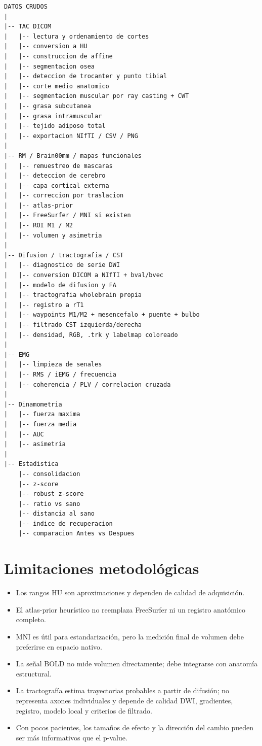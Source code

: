 \documentclass[12pt,a4paper]{article}
\begin{document}
\begin{lstlisting}
DATOS CRUDOS
|
|-- TAC DICOM
|   |-- lectura y ordenamiento de cortes
|   |-- conversion a HU
|   |-- construccion de affine
|   |-- segmentacion osea
|   |-- deteccion de trocanter y punto tibial
|   |-- corte medio anatomico
|   |-- segmentacion muscular por ray casting + CWT
|   |-- grasa subcutanea
|   |-- grasa intramuscular
|   |-- tejido adiposo total
|   |-- exportacion NIfTI / CSV / PNG
|
|-- RM / Brain00mm / mapas funcionales
|   |-- remuestreo de mascaras
|   |-- deteccion de cerebro
|   |-- capa cortical externa
|   |-- correccion por traslacion
|   |-- atlas-prior
|   |-- FreeSurfer / MNI si existen
|   |-- ROI M1 / M2
|   |-- volumen y asimetria
|
|-- Difusion / tractografia / CST
|   |-- diagnostico de serie DWI
|   |-- conversion DICOM a NIfTI + bval/bvec
|   |-- modelo de difusion y FA
|   |-- tractografia wholebrain propia
|   |-- registro a rT1
|   |-- waypoints M1/M2 + mesencefalo + puente + bulbo
|   |-- filtrado CST izquierda/derecha
|   |-- densidad, RGB, .trk y labelmap coloreado
|
|-- EMG
|   |-- limpieza de senales
|   |-- RMS / iEMG / frecuencia
|   |-- coherencia / PLV / correlacion cruzada
|
|-- Dinamometria
|   |-- fuerza maxima
|   |-- fuerza media
|   |-- AUC
|   |-- asimetria
|
|-- Estadistica
    |-- consolidacion
    |-- z-score
    |-- robust z-score
    |-- ratio vs sano
    |-- distancia al sano
    |-- indice de recuperacion
    |-- comparacion Antes vs Despues
\end{lstlisting}

\section{Limitaciones metodológicas}

\begin{itemize}
    
    \item Los rangos HU son aproximaciones y dependen de calidad de adquisición.
    \item El atlas-prior heurístico no reemplaza FreeSurfer ni un registro anatómico completo.
    \item MNI es útil para estandarización, pero la medición final de volumen debe preferirse en espacio nativo.
    \item La señal BOLD no mide volumen directamente; debe integrarse con anatomía estructural.
    \item La tractografía estima trayectorias probables a partir de difusión; no representa axones individuales y depende de calidad DWI, gradientes, registro, modelo local y criterios de filtrado.
    \item Con pocos pacientes, los tamaños de efecto y la dirección del cambio pueden ser más informativos que el p-value.
\end{itemize}
\end{document}
